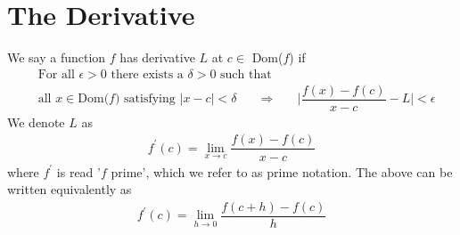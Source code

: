 \section{The Derivative}

\begin{definition}
We say a function $f$ has derivative $L$ at $c \in$ Dom($f$) if 
\begin{align*}
    &\text{For all} \hspace{4pt} \epsilon > 0 \hspace{4pt} \text{there exists a} \hspace{4pt} \delta > 0 \hspace{4pt} \text{such that}\\[2ex]
    &\text{all} \hspace{4pt} x \in \text{Dom($f$)} \hspace{4pt} \text{satisfying} \hspace{4pt} \lvert x-c \rvert < \delta \hspace{20pt} \Longrightarrow \hspace{20pt} \Big\lvert \dfrac{f(x)-f(c)}{x-c}-L \Big\rvert < \epsilon
\end{align*}
We denote $L$ as
\begin{align*}
f^{'}(c) = \lim_{x \longrightarrow c} \dfrac{f(x)-f(c)}{x-c}
\end{align*}
where $f^{'}$ is read '$f$ prime', which we refer to as prime notation. The above can be written equivalently as
\begin{align*}
    f^{'}(c) = \lim_{h \longrightarrow 0} \dfrac{f(c+h)-f(c)}{h}
\end{align*}
\end{definition}

